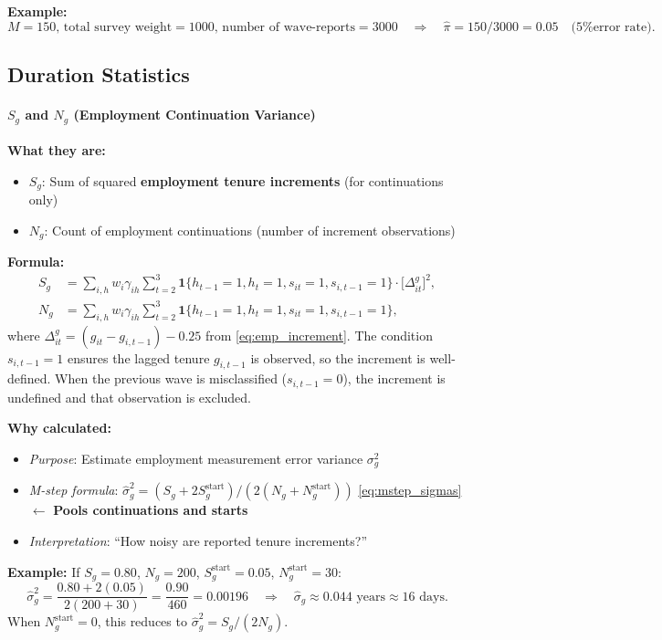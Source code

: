 \documentclass[12pt]{article}
\begin{document}
\textbf{Example:}
\[
M = 150,\, \text{total survey weight} = 1000,\, \text{number of wave-reports} = 3000 \quad\Rightarrow\quad \hat{\pi} = 150/3000 = 0.05 \quad\text{(5\% error rate)}.
\]

\subsection{Duration Statistics}

\paragraph{$S_g$ and $N_g$ (Employment Continuation Variance)}

\textbf{What they are:}
\begin{itemize}
\item $S_g$: Sum of squared \textbf{employment tenure increments} (for continuations only)
\item $N_g$: Count of employment continuations (number of increment observations)
\end{itemize}

\textbf{Formula:}
\begin{align*}
S_g &= \sum_{i,h} w_i\gamma_{ih}\sum_{t=2}^3 \mathbf{1}\{h_{t-1}=1, h_t=1, s_{it}=1, s_{i,t-1}=1\} \cdot \big[\Delta^g_{it}\big]^2,\\
N_g &= \sum_{i,h} w_i\gamma_{ih}\sum_{t=2}^3 \mathbf{1}\{h_{t-1}=1, h_t=1, s_{it}=1, s_{i,t-1}=1\},
\end{align*}
where $\Delta^g_{it} = (g_{it} - g_{i,t-1}) - 0.25$ from \eqref{eq:emp_increment}. The condition $s_{i,t-1}=1$ ensures the lagged tenure $g_{i,t-1}$ is observed, so the increment is well-defined. When the previous wave is misclassified ($s_{i,t-1}=0$), the increment is undefined and that observation is excluded.

\textbf{Why calculated:}
\begin{itemize}
\item \emph{Purpose}: Estimate employment measurement error variance $\sigma_g^2$
\item \emph{M-step formula}: $\hat{\sigma}_g^2 = (S_g + 2S_g^{\mathrm{start}}) / (2(N_g + N_g^{\mathrm{start}}))$ \eqref{eq:mstep_sigmas} \quad$\leftarrow$ \textbf{Pools continuations and starts}
\item \emph{Interpretation}: ``How noisy are reported tenure increments?''
\end{itemize}

\textbf{Example:}
If $S_g = 0.80$, $N_g = 200$, $S_g^{\mathrm{start}} = 0.05$, $N_g^{\mathrm{start}} = 30$:
\[
\hat{\sigma}_g^2 = \frac{0.80 + 2(0.05)}{2(200+30)} = \frac{0.90}{460} = 0.00196 \quad\Rightarrow\quad \hat{\sigma}_g \approx 0.044\text{ years} \approx 16\text{ days}.
\]
When $N_g^{\mathrm{start}}=0$, this reduces to $\hat{\sigma}_g^2 = S_g/(2N_g)$.
\end{document}
